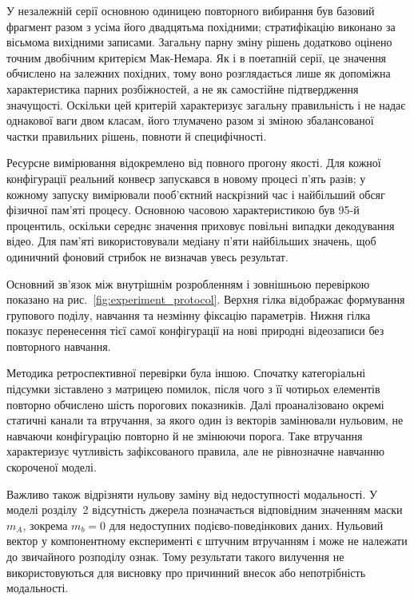 У незалежній серії основною одиницею повторного вибирання був базовий фрагмент разом з усіма його двадцятьма похідними; стратифікацію виконано за вісьмома вихідними записами. Загальну парну зміну рішень додатково оцінено точним двобічним критерієм Мак-Немара. Як і в поетапній серії, це значення обчислено на залежних похідних, тому воно розглядається лише як допоміжна характеристика парних розбіжностей, а не як самостійне підтвердження значущості. Оскільки цей критерій характеризує загальну правильність і не надає однакової ваги двом класам, його тлумачено разом зі зміною збалансованої частки правильних рішень, повноти й специфічності.

Ресурсне вимірювання відокремлено від повного прогону якості. Для кожної конфігурації реальний конвеєр запускався в новому процесі п’ять разів; у кожному запуску вимірювали пооб’єктний наскрізний час і найбільший обсяг фізичної пам’яті процесу. Основною часовою характеристикою був 95-й процентиль, оскільки середнє значення приховує повільні випадки декодування відео. Для пам’яті використовували медіану п’яти найбільших значень, щоб одиничний фоновий стрибок не визначав увесь результат.

Основний зв’язок між внутрішнім розробленням і зовнішньою перевіркою показано на рис.~\ref{fig:experiment_protocol}. Верхня гілка відображає формування групового поділу, навчання та незмінну фіксацію параметрів. Нижня гілка показує перенесення тієї самої конфігурації на нові природні відеозаписи без повторного навчання.



Методика ретроспективної перевірки була іншою. Спочатку категоріальні підсумки зіставлено з матрицею помилок, після чого з її чотирьох елементів повторно обчислено шість порогових показників. Далі проаналізовано окремі статичні канали та втручання, за якого один із векторів замінювали нульовим, не навчаючи конфігурацію повторно й не змінюючи порога. Таке втручання характеризує чутливість зафіксованого правила, але не рівнозначне навчанню скороченої моделі.

Важливо також відрізняти нульову заміну від недоступності модальності. У моделі розділу~2 відсутність джерела позначається відповідним значенням маски $m_A$, зокрема $m_b=0$ для недоступних подієво-поведінкових даних. Нульовий вектор у компонентному експерименті є штучним втручанням і може не належати до звичайного розподілу ознак. Тому результати такого вилучення не використовуються для висновку про причинний внесок або непотрібність модальності.

